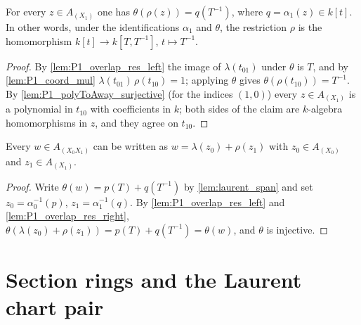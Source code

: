 \begin{lemma}
  \label{lem:P1_overlap_res_right}
  \leanok
  For every \(z \in A_{(X_1)}\) one has \(\theta(\rho(z)) = q(T^{-1})\), where
  \(q = \alpha_1(z) \in k[t]\). In other words, under the identifications \(\alpha_1\) and
  \(\theta\), the restriction \(\rho\) is the homomorphism \(k[t] \to k[T, T^{-1}]\),
  \(t \mapsto T^{-1}\).
\end{lemma}
\begin{proof}
  \leanok
  By \ref{lem:P1_overlap_res_left} the image of \(\lambda(t_{01})\) under \(\theta\) is
  \(T\), and by \ref{lem:P1_coord_mul} \(\lambda(t_{01})\,\rho(t_{10}) = 1\); applying
  \(\theta\) gives \(\theta(\rho(t_{10})) = T^{-1}\). By
  \ref{lem:P1_polyToAway_surjective} (for the indices \((1,0)\)) every \(z \in A_{(X_1)}\)
  is a polynomial in \(t_{10}\) with coefficients in \(k\); both sides of the claim are
  \(k\)-algebra homomorphisms in \(z\), and they agree on \(t_{10}\).
\end{proof}

\begin{lemma}
  \label{lem:P1_overlap_span}
  \leanok
  Every \(w \in A_{(X_0 X_1)}\) can be written as \(w = \lambda(z_0) + \rho(z_1)\) with
  \(z_0 \in A_{(X_0)}\) and \(z_1 \in A_{(X_1)}\).
\end{lemma}
\begin{proof}
  \leanok
  Write \(\theta(w) = p(T) + q(T^{-1})\) by \ref{lem:laurent_span} and set
  \(z_0 = \alpha_0^{-1}(p)\), \(z_1 = \alpha_1^{-1}(q)\). By
  \ref{lem:P1_overlap_res_left} and \ref{lem:P1_overlap_res_right},
  \(\theta(\lambda(z_0) + \rho(z_1)) = p(T) + q(T^{-1}) = \theta(w)\), and \(\theta\) is
  injective.
\end{proof}

\section{Section rings and the Laurent chart pair}

